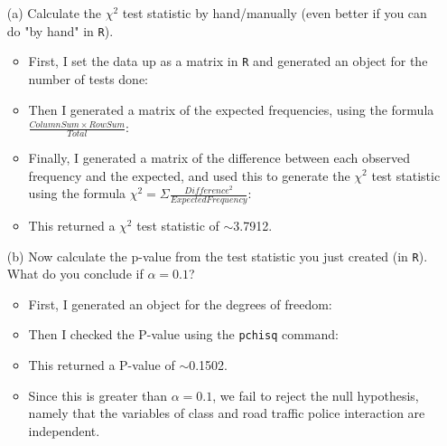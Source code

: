 \documentclass[12pt,letterpaper]{article}
\begin{document}
	\begin{enumerate}
		
		\item [(a)]
		Calculate the $\chi^2$ test statistic by hand/manually (even better if you can do "by hand" in \texttt{R}).\\
		
		\begin{itemize}
			\item First, I set the data up as a matrix in \texttt{R} and generated an object for the number of tests done: 
			\item Then I generated a matrix of the expected frequencies, using the formula $\frac{Column Sum \times Row Sum}{Total}$: 
			\item Finally, I generated a matrix of the difference between each observed frequency and the expected, and used this to generate the $\chi^2$ test statistic using the formula $\chi^2 = \Sigma\frac{Difference^2}{Expected Frequency}$: 
			\item This returned a $\chi^2$ test statistic of $\sim$3.7912.
		\end{itemize}
		
		\vspace{1cm}
		
		\item [(b)]
		Now calculate the p-value from the test statistic you just created (in \texttt{R}). What do you conclude if $\alpha = 0.1$?\\
		
		\begin{itemize}
			\item First, I generated an object for the degrees of freedom: 
			\item Then I checked the P-value using the \texttt{pchisq} command: 
			\item This returned a P-value of $\sim$0.1502.
			\item Since this is greater than $\alpha = 0.1$, we fail to reject the null hypothesis, namely that the variables of class and road traffic police interaction are independent.
		\end{itemize}
		

\end{enumerate}
\end{document}
